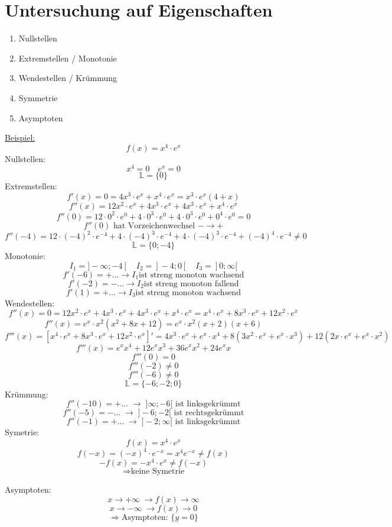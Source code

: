 \documentclass{scrbook}
\begin{document}
\chapter{Untersuchung auf Eigenschaften}
\begin{enumerate}
\item Nullstellen
\item Extremstellen / Monotonie
\item Wendestellen / Krümmung
\item Symmetrie
\item Asymptoten
\end{enumerate}

\underline{Beispiel:}
\[f(x) = x^4 \cdot e^x\]
Nullstellen:
\[x^4 = 0 \quad e^x = 0\]
\[ \mathbb{L} = \{0\}\]
Extremstellen:
\[f'(x) = 0 = 4x^3\cdot e^x + x^4 \cdot e^x = x^3\cdot e^x(4 + x)\]
\[f''(x) = 12x^2 \cdot e^x + 4x^3 \cdot e^x + 4x^3\cdot e^x + x^4 \cdot e^x\]
\[f''(0) = 12 \cdot 0^2 \cdot e^0 + 4\cdot 0^3 \cdot e^0 + 4\cdot 0^3\cdot e^0 + 0^4 \cdot e^0= 0\]
\[f''(0) \text{ hat Vorzeichenwechsel } - \to +\]
\[f''(-4) = 12\cdot (-4)^2 \cdot e^{-4} + 4\cdot(-4)^3 \cdot e^{-4}+ 4\cdot(-4)^3\cdot e^{-4} + (-4)^4 \cdot e^{-4}\not = 0\] 
\[ \mathbb{L} = \{ 0; -4\}\]
Monotonie:
\[I_1 = ]-\infty;-4[ \quad I_2 = ]-4;0[ \quad I_3 = ]0; \infty[\] 
\[f'(-6) = + \ldots \rightarrow I_1\text{ist streng monoton wachsend}\]
\[f'(-2) = - \ldots \rightarrow I_2\text{ist streng monoton fallend}\]
\[f'(1) = + \ldots \rightarrow I_3\text{ist streng monoton wachsend}\]
Wendestellen:
\[f''(x) = 0 = 12x^2 \cdot e^x + 4x^3 \cdot e^x + 4x^3\cdot e^x + x^4 \cdot e^x = x^4 \cdot e^x + 8x^3 \cdot e^x + 12x^2 \cdot e^x\]
\[f''(x)= e^x \cdot x^2 (x^2 + 8x +12) = e^x \cdot x^2 (x + 2)(x+6)\]
\[f'''(x) = [x^4 \cdot e^x + 8x^3 \cdot e^x + 12x^2 \cdot e^x]' = 4x^3 \cdot e^x + e^x \cdot x^4 + 8(3x^2 \cdot e^x + e^x \cdot x^3) + 12(2x\cdot e^x+e^x\cdot  x^2)\]
\[f'''(x) = e^x x^4 + 12e^xx^3 + 36 e^xx^2 + 24e^xx\]
\[f'''(0) = 0\]
\[f'''(-2) \not = 0\]
\[f'''(-6)\not = 0\]
\[\mathbb{L} = \{-6;-2;0\}\]
Krümmung:
\[f''(-10) = +\ldots \; \rightarrow \; ]\infty;-6[ \text{ ist linksgekrümmt}\]
\[f''(-5) = -\ldots \; \rightarrow \;]-6;-2[ \text{ ist rechtsgekrümmt}\]
\[f''(-1) = +\ldots \; \rightarrow \;]-2;\infty[ \text{ ist linksgekrümmt}\]
Symetrie:
\[f(x) = x^4 \cdot e^x\]
\[f(-x) =  (-x)^4 \cdot e^{-x} = x^4 e^{-x} \not = f(x)\]
\[-f(x) = - x^4 \cdot e^x \not = f(-x)\]
\[ \Rightarrow \text{keine Symetrie}\]

Asymptoten:
\[x \to +\infty \; \rightarrow f(x) \to \infty \] 
\[x \to -\infty \; \rightarrow f(x) \to 0\]
\[\Rightarrow \text{Asymptoten: } \{y = 0\} \]
\end{document}
